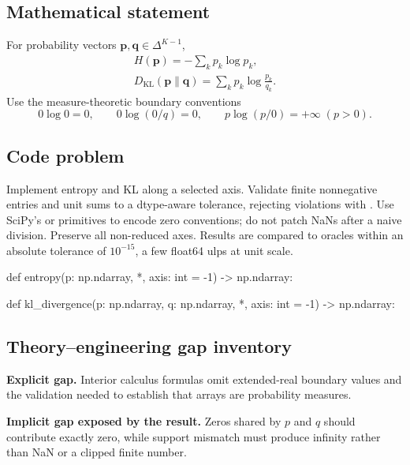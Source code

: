 
        \subsection{Mathematical statement}


For probability vectors $\bm p,\bm q\in\Delta^{K-1}$,
\[
\begin{gathered}
H(\bm p)=-\sum_k p_k\log p_k,\\
D_{\mathrm{KL}}(\bm p\|\bm q)=\sum_k p_k\log\frac{p_k}{q_k}.
\end{gathered}
\]
Use the measure-theoretic boundary conventions
\[
0\log0=0,\qquad 0\log(0/q)=0,\qquad p\log(p/0)=+\infty\;(p>0).
\]


        \subsection{Code problem}


Implement entropy and KL along a selected axis.  Validate finite nonnegative
entries and unit sums to a dtype-aware tolerance, rejecting violations with
.  Use SciPy's  or
 primitives to encode zero conventions; do not patch NaNs after a
naive division.  Preserve all non-reduced axes.  Results are compared to
oracles within an absolute tolerance of \(10^{-15}\), a few float64 ulps at
unit scale.


        \begin{contractbox}
        \begin{Code}
        def entropy(p: np.ndarray, *, axis: int = -1) -> np.ndarray:

def kl_divergence(p: np.ndarray, q: np.ndarray, *, axis: int = -1) -> np.ndarray:
        \end{Code}
        \end{contractbox}

        \subsection{Theory--engineering gap inventory}

        \begin{gapbox}
        \textbf{Explicit gap.} Interior calculus formulas omit extended-real boundary values and the validation needed to establish that arrays are probability measures.

        \textbf{Implicit gap exposed by the result.} Zeros shared by $p$ and $q$ should contribute exactly zero, while support mismatch must produce infinity rather than NaN or a clipped finite number.
        \end{gapbox}

